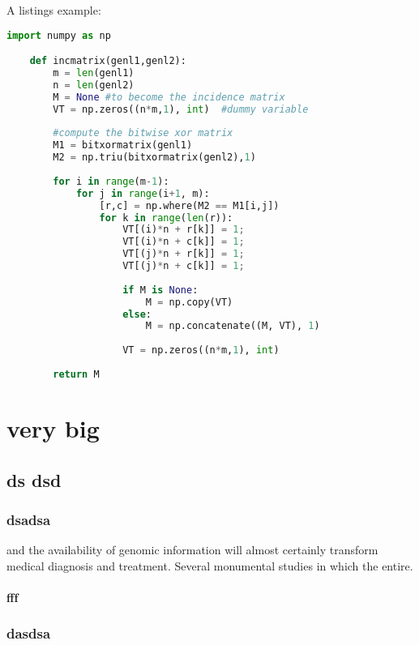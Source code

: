 \documentclass[]{subook}
\begin{document}
A listings example:
\begin{lstlisting}[language=Python, caption=Python example]
    import numpy as np

    def incmatrix(genl1,genl2):
        m = len(genl1)
        n = len(genl2)
        M = None #to become the incidence matrix
        VT = np.zeros((n*m,1), int)  #dummy variable
        
        #compute the bitwise xor matrix
        M1 = bitxormatrix(genl1)
        M2 = np.triu(bitxormatrix(genl2),1) 
    
        for i in range(m-1):
            for j in range(i+1, m):
                [r,c] = np.where(M2 == M1[i,j])
                for k in range(len(r)):
                    VT[(i)*n + r[k]] = 1;
                    VT[(i)*n + c[k]] = 1;
                    VT[(j)*n + r[k]] = 1;
                    VT[(j)*n + c[k]] = 1;
                    
                    if M is None:
                        M = np.copy(VT)
                    else:
                        M = np.concatenate((M, VT), 1)
                    
                    VT = np.zeros((n*m,1), int)
        
        return M
    \end{lstlisting}


\part{very big}


\chapter{ds dsd}
\minitoc

\section{dsadsa}

\lipsum[1-6]
and the availability of genomic information will almost certainly transform medical diagnosis and treatment. Several monumental studies in which the entire\citep{LevelUpTheGuidetoGreatVideoGameDesign_Rogers}.
\subsection{fff}
\lipsum[2]
\section{dasdsa}
\lipsum[2-4]

\end{document}
